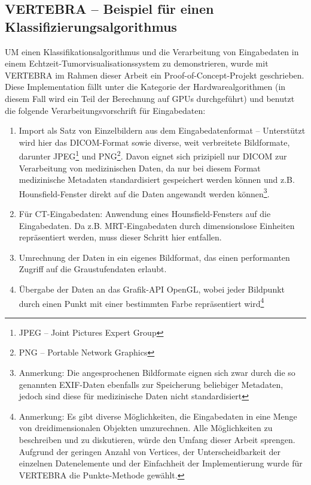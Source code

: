 \documentclass[ngerman,pdftex,paper=A4,DIV=calc,titlepage,12pt]{scrartcl}
\newtheorem[L]{boxedDefinition}{Definition}
\begin{document}
\subsection{VERTEBRA -- Beispiel für einen Klassifizierungsalgorithmus}\label{ssec:algoexample}
UM einen Klassifikationsalgorithmus und die Verarbeitung von Eingabedaten in einem Echtzeit-Tumorvisualisationssystem zu demonstrieren, wurde mit VERTEBRA im Rahmen dieser Arbeit ein Proof-of-Concept-Projekt geschrieben. Diese Implementation fällt unter die Kategorie der Hardwarealgorithmen (in diesem Fall wird ein Teil der Berechnung auf GPUs durchgeführt) und benutzt die folgende Verarbeitungsvorschrift für Eingabedaten:
\begin{enumerate}
 \item Import als Satz von Einzelbildern aus dem Eingabedatenformat -- Unterstützt wird hier das DICOM-Format sowie diverse, weit verbreitete Bildformate, darunter JPEG\footnote{JPEG -- Joint Pictures Expert Group} und PNG\footnote{PNG -- Portable Network Graphics}. Davon eignet sich prizipiell nur DICOM zur Verarbeitung von medizinischen Daten, da nur bei diesem Format medizinische Metadaten standardisiert gespeichert werden können und z.B. Hounsfield-Fenster direkt auf die Daten angewandt werden können\footnote{Anmerkung: Die angesprochenen Bildformate eignen sich zwar durch die so genannten EXIF-Daten ebenfalls zur Speicherung beliebiger Metadaten, jedoch sind diese für medizinische Daten nicht standardisiert}.
 \item Für CT-Eingabedaten: Anwendung eines Hounsfield-Fensters auf die Eingabedaten. Da z.B. MRT-Eingabedaten durch dimensionslose Einheiten repräsentiert werden, muss dieser Schritt hier entfallen.
 \item Umrechnung der Daten in ein eigenes Bildformat, das einen performanten Zugriff auf die Graustufendaten erlaubt.
 \item Übergabe der Daten an das Grafik-API OpenGL, wobei jeder Bildpunkt durch einen Punkt mit einer bestimmten Farbe repräsentiert wird\footnote{Anmerkung: Es gibt diverse Möglichkeiten, die Eingabedaten in eine Menge von dreidimensionalen Objekten umzurechnen. Alle Möglichkeiten zu beschreiben und zu diskutieren, würde den Umfang dieser Arbeit sprengen. Aufgrund der geringen Anzahl von Vertices, der Unterscheidbarkeit der einzelnen Datenelemente und der Einfachheit der Implementierung wurde für VERTEBRA die Punkte-Methode gewählt.}

\end{enumerate}
\end{document}
